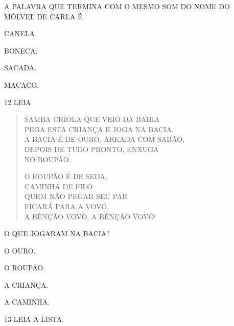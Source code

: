\begin{escola}
{A PALAVRA QUE TERMINA COM O MESMO SOM DO NOME DO MÓLVEL DE CARLA É

\begin{escolha}
\item CANELA.

\item BONECA.

\item SACADA.

\item MACACO.
\end{escolha}


\num{12} LEIA

\begin{verse}
SAMBA CRIOLA QUE VEIO DA BAHIA\\
PEGA ESTA CRIANÇA E JOGA NA BACIA.\\
A BACIA É DE OURO, AREADA COM SABÃO,\\
DEPOIS DE TUDO PRONTO, ENXUGA\\
NO ROUPÃO.

O ROUPÃO É DE SEDA,\\
CAMINHA DE FILÓ\\
QUEM NÃO PEGAR SEU PAR\\
FICARÁ PARA A VOVÓ.\\
A BÊNÇÃO VOVÓ, A BÊNÇÃO VOVÓ!
\end{verse}


O QUE JOGARAM NA BACIA?

\begin{escolha}
\item O OURO.

\item O ROUPÃO.

\item A CRIANÇA.

\item A CAMINHA.
\end{escolha}


\num{13} LEIA A LISTA.

}
\end{escola}
